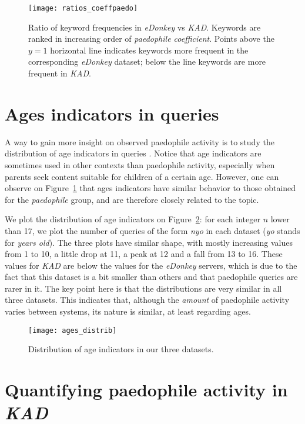 \documentclass[a4paper,oneside,12pt]{article}
\newcommand{\edonkey}{{\em eDonkey}\xspace}
\newcommand{\kad}{{\em KAD}\xspace}
\newcommand{\paedocoeff}{{\em paedophile coefficient}\xspace}
\begin{document}
\begin{figure}[!ht]
\centering
\texttt{[image: ratios\_coeffpaedo]}
\caption{
Ratio of keyword frequencies in \edonkey vs \kad. Keywords are ranked in increasing order of \paedocoeff. Points above the $y=1$ horizontal line indicates keywords more frequent in the corresponding \edonkey dataset; below the line keywords are more frequent in \kad. 
}
\label{fig-wordsOcc}
\end{figure}

\section{Ages indicators in queries}
\label{sec-ages}
A way to gain more insight on observed paedophile activity is to study the distribution of age indicators in queries \cite{steel09child}. Notice that age indicators are sometimes used in other contexts than paedophile activity, especially when parents seek content suitable for children of a certain age. However, one can observe on Figure~\ref{fig-wordsOcc} that ages indicators have similar behavior to those obtained for the {\em paedophile} group, and are therefore closely related to the topic. 

We plot the distribution of age indicators on Figure~\ref{fig-ages}: for each integer $n$ lower than 17, we plot the number of queries of the form {\em nyo} in each dataset ({\em yo} stands for {\em years old}). The three plots have similar shape, with mostly increasing values from 1 to 10, a little drop at 11, a peak at 12 and a fall from 13 to 16. These values for \kad are below the values for the \edonkey servers, which is due to the fact that this dataset is a bit smaller than others and that paedophile queries are rarer in it. The key point here is that the distributions are very similar in all three datasets. This indicates that, although the {\em amount} of paedophile activity varies between systems, its nature is similar, at least regarding ages.

\begin{figure}[!ht]
\centering
\texttt{[image: ages\_distrib]}
\caption{
Distribution of age indicators in our three datasets.
}
\label{fig-ages}
\end{figure}

\section{Quantifying paedophile activity in \kad}
\label{sec-inference}
\end{document}
